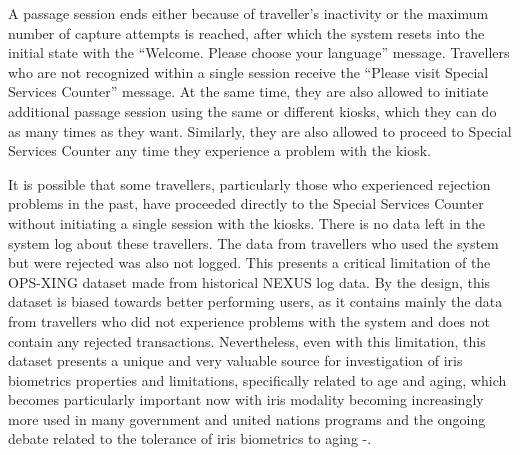\documentclass{cta-author}%
\begin{document}
A passage session ends either because of traveller's inactivity or the maximum number of capture attempts is reached, after which the system resets into the initial state with the ``Welcome. Please choose your language'' message.
Travellers who are not recognized  within a single session receive the ``Please visit Special Services Counter'' message. At the same time, they are also allowed to initiate additional passage session  using the same or different kiosks, which they can do as many times as they want. Similarly, they are also allowed to proceed to Special Services Counter any time they experience a problem with the kiosk. 

It is possible that some travellers, particularly those who experienced rejection problems in the past, have proceeded directly to the Special Services Counter  without  initiating a single session with the kiosks. 
There is no data left in the system log about these travellers.
The data from travellers who used the system but were rejected was also not logged.
This presents a critical limitation of the 
OPS-XING dataset made from historical NEXUS log data. By the design, this  dataset is biased towards better performing users, as it contains mainly the data from travellers who did not experience problems with the system and does not contain any rejected transactions.
Nevertheless, 
even with this limitation, this dataset presents a unique and very valuable source for investigation of iris biometrics properties and limitations, specifically related to age and aging, which 
becomes particularly important now with iris modality becoming increasingly more  used in many government and united nations programs \cite{kn:Rathgeb-IBPC2014,FBI-IJCB2014} 
and the ongoing debate related to the tolerance of iris biometrics to aging \cite{IET0}-\cite{aging3}.
\end{document}
